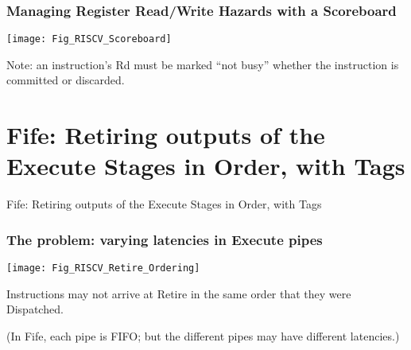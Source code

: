 \begin{frame}[fragile]
\frametitle{Managing Register Read/Write Hazards with a Scoreboard}

\footnotesize

\begin{center}
 \texttt{[image: Fig\_RISCV\_Scoreboard]}
\end{center}

\vspace{2ex}

Note: an instruction's Rd must be marked ``not busy'' whether the
instruction is committed or discarded.

\end{frame}


\section{Fife: Retiring outputs of the Execute Stages in Order, with Tags}

\begin{frame}

\begin{center}
  {\LARGE Fife: Retiring outputs of the Execute Stages in Order, with Tags}
\end{center}

\end{frame}


\begin{frame}[fragile]
\frametitle{The problem: varying latencies in Execute pipes}

\footnotesize

\begin{center}
 \texttt{[image: Fig\_RISCV\_Retire\_Ordering]}
\end{center}

\vspace{1ex}

Instructions may not arrive at Retire in the same order that they were Dispatched.

\vspace{1ex}

(In Fife, each pipe is FIFO; but the different pipes may have different latencies.)

\end{frame}


